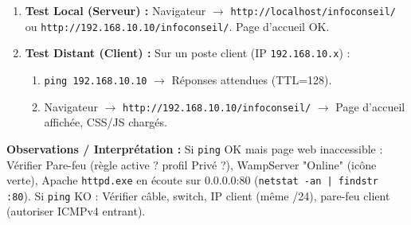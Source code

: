 \documentclass[11pt]{article}
\begin{document}
\begin{experience}
\begin{enumerate}
          \begin{enumerate}
              \item Règles de trafic entrant $\to$ Nouvelle règle $\to$ Port $\to$ Suivant.
              \item TCP, Ports locaux spécifiques : \texttt{80} $\to$ Suivant.
              \item Autoriser la connexion $\to$ Suivant.
              \item Profils : \textbf{Domaine, Privé} (décocher Public) $\to$ Suivant.
              \item Nom : \texttt{HTTP InfoConseil LAN} $\to$ Terminer.
          \end{enumerate}
    \item \textbf{Test Local (Serveur) :} Navigateur $\to$ \texttt{http://localhost/infoconseil/} ou \texttt{http://192.168.10.10/infoconseil/}. Page d'accueil OK.
    \item \textbf{Test Distant (Client) :} Sur un poste client (IP \texttt{192.168.10.x}) :
          \begin{enumerate}
              \item \texttt{ping 192.168.10.10} $\to$ Réponses attendues (TTL=128).
              \item Navigateur $\to$ \texttt{http://192.168.10.10/infoconseil/} $\to$ Page d'accueil affichée, CSS/JS chargés.
          \end{enumerate}
\end{enumerate}

\textbf{Observations / Interprétation :} Si \texttt{ping} OK mais page web inaccessible : Vérifier Pare-feu (règle active ? profil Privé ?), WampServer "Online" (icône verte), Apache \texttt{httpd.exe} en écoute sur 0.0.0.0:80 (\texttt{netstat -an | findstr :80}). Si \texttt{ping} KO : Vérifier câble, switch, IP client (même /24), pare-feu client (autoriser ICMPv4 entrant).
\end{experience}
\end{document}
